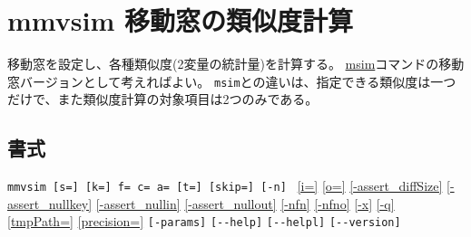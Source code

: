 
%

\section{mmvsim 移動窓の類似度計算\label{sect:mmvsim}}

移動窓を設定し、各種類似度(2変量の統計量)を計算する。
\hyperref[sect:msim]{msim}コマンドの移動窓バージョンとして考えればよい。
\verb|msim|との違いは、指定できる類似度は一つだけで、また類似度計算の対象項目は2つのみである。

\subsection*{書式}
\verb|mmvsim [s=] [k=] f= c= a= [t=] [skip=] [-n] |
\hyperref[sect:option_i]{[i=]}
\hyperref[sect:option_o]{[o=]}
\hyperref[sect:option_assert_diffSize]{[-assert\_diffSize]}
\hyperref[sect:option_assert_nullkey]{[-assert\_nullkey]}
\hyperref[sect:option_assert_nullin]{[-assert\_nullin]}
\hyperref[sect:option_assert_nullout]{[-assert\_nullout]}
\hyperref[sect:option_nfn]{[-nfn]} 
\hyperref[sect:option_nfno]{[-nfno]}  
\hyperref[sect:option_x]{[-x]}
\hyperref[sect:option_q]{[-q]}
\hyperref[sect:option_option_tmppath]{[tmpPath=]}
\hyperref[sect:option_precision]{[precision=]}
\verb|[-params]|
\verb|[--help]|
\verb|[--helpl]|
\verb|[--version]|\\

